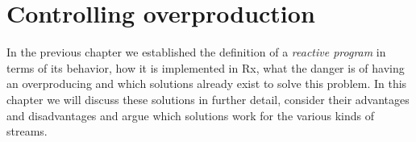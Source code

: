 \chapter{Controlling overproduction}
\label{chap:exploring-the-problem-space}
In the previous chapter we established the definition of a \textit{reactive program} in terms of its behavior, how it is implemented in Rx, what the danger is of having an overproducing \obs and which solutions already exist to solve this problem. In this chapter we will discuss these solutions in further detail, consider their advantages and disadvantages and argue which solutions work for the various kinds of streams.





%

%